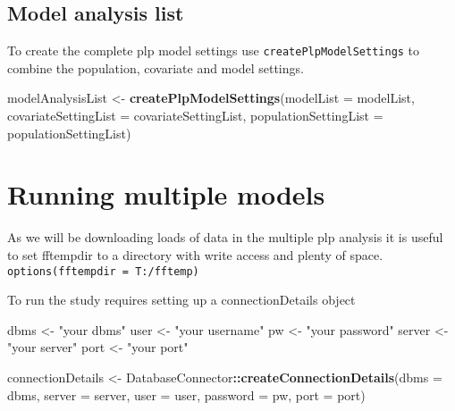 \documentclass[]{article}
\newenvironment{Shaded}{\begin{snugshade}}{\end{snugshade}}
\newcommand{\KeywordTok}[1]{\textcolor[rgb]{0.13,0.29,0.53}{\textbf{#1}}}
\newcommand{\DataTypeTok}[1]{\textcolor[rgb]{0.13,0.29,0.53}{#1}}
\newcommand{\StringTok}[1]{\textcolor[rgb]{0.31,0.60,0.02}{#1}}
\newcommand{\OperatorTok}[1]{\textcolor[rgb]{0.81,0.36,0.00}{\textbf{#1}}}
\newcommand{\NormalTok}[1]{#1}
\begin{document}
\subsection{Model analysis list}\label{model-analysis-list}

To create the complete plp model settings use
\texttt{createPlpModelSettings} to combine the population, covariate and
model settings.

\begin{Shaded}
\begin{Highlighting}[]
\NormalTok{modelAnalysisList <-}\StringTok{ }\KeywordTok{createPlpModelSettings}\NormalTok{(}\DataTypeTok{modelList =}\NormalTok{ modelList, }
                                   \DataTypeTok{covariateSettingList =}\NormalTok{ covariateSettingList,}
                                   \DataTypeTok{populationSettingList =}\NormalTok{ populationSettingList)}
\end{Highlighting}
\end{Shaded}

\section{Running multiple models}\label{running-multiple-models}

As we will be downloading loads of data in the multiple plp analysis it
is useful to set fftempdir to a directory with write access and plenty
of space.
\texttt{options(fftempdir\ =\ \textquotesingle{}T:/fftemp\textquotesingle{})}

To run the study requires setting up a connectionDetails object

\begin{Shaded}
\begin{Highlighting}[]
\NormalTok{dbms <-}\StringTok{ "your dbms"}
\NormalTok{user <-}\StringTok{ "your username"}
\NormalTok{pw <-}\StringTok{ "your password"}
\NormalTok{server <-}\StringTok{ "your server"}
\NormalTok{port <-}\StringTok{ "your port"}

\NormalTok{connectionDetails <-}\StringTok{ }\NormalTok{DatabaseConnector}\OperatorTok{::}\KeywordTok{createConnectionDetails}\NormalTok{(}\DataTypeTok{dbms =}\NormalTok{ dbms,}
                                                                \DataTypeTok{server =}\NormalTok{ server,}
                                                                \DataTypeTok{user =}\NormalTok{ user,}
                                                                \DataTypeTok{password =}\NormalTok{ pw,}
                                                                \DataTypeTok{port =}\NormalTok{ port)}
\end{Highlighting}
\end{Shaded}
\end{document}
